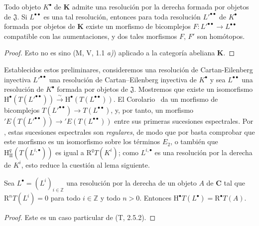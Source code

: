 \begin{corollary}[11.5.2.2]
\label{0.11.5.2.2}
\label{0.11.5.2.2-fr}
Todo objeto $K^\bullet$ de $\boldsymbol{K}$ admite una resolución por la derecha formada por objetos de $\mathfrak J$.
Si $L^{\bullet\bullet}$ es una tal resolución, entonces para toda resolución $L'^{\bullet\bullet}$ de $K^\bullet$ formada por objetos de $\boldsymbol{K}$ existe un morfismo de bicomplejos
$F:L'^{\bullet\bullet}\to L^{\bullet\bullet}$ compatible con las aumentaciones, y dos tales morfismos $F$, $F'$ son homótopos.
\end{corollary}

\begin{proof}
Esto no es sino (M, V, 1.1 \emph{a)}) aplicado a la categoría abeliana
$\boldsymbol{K}$.
\end{proof}

\begin{env}[11.5.2.3]
\label{0.11.5.2.3-fr}
Establecidos estos preliminares, consideremos una resolución de Cartan-Eilenberg inyectiva $L'^{\bullet\bullet}$ una resolución de Cartan--Eilenberg inyectiva de $K^\bullet$ y sea $L^{\bullet\bullet}$ una resolución de $K^\bullet$ formada por objetos de $\mathfrak J$.
Mostremos que existe un isomorfismo
$\mathrm H^\bullet(T(L'^{\bullet\bullet}))\xrightarrow{\sim}\mathrm H^\bullet(T(L^{\bullet\bullet}))$.
El Corolario~ da un morfismo de bicomplejos
$T(L'^{\bullet\bullet})\to T(L^{\bullet\bullet})$,
y, por tanto, un morfismo
$'E(T(L'^{\bullet\bullet}))\to{}'E(T(L^{\bullet\bullet}))$
entre sus primeras sucesiones espectrales.
Por , estas sucesiones espectrales son \emph{regulares}, de modo que por  basta comprobar que este morfismo es un isomorfismo sobre los términos $E_2$, o también que $\mathrm H_{\mathrm{II}}^q(T(L^{i,\bullet}))$ es igual a $\mathrm R^qT(K^i)$; como $L^{i,\bullet}$ es una resolución por la derecha de $K^i$, esto reduce la cuestión al lema siguiente.
\end{env}

\begin{lemma}[11.5.2.4]
\label{0.11.5.2.4}
\label{0.11.5.2.4-fr}
Sea $L^\bullet=(L^i)_{i\in\mathbb Z}$ una resolución por la derecha de un objeto $A$ de $\boldsymbol{C}$ tal que $\mathrm R^nT(L^i)=0$ para todo $i\in\mathbb Z$ y todo $n>0$.
Entonces
$\mathrm H^\bullet T(L^\bullet)=\mathrm R^\bullet T(A)$.
\end{lemma}

\begin{proof}
Este es un caso particular de (T, 2.5.2).
\end{proof}


